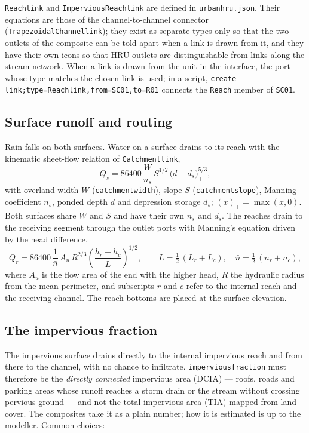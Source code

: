 \documentclass[11pt,a4paper]{article}
\newcommand{\code}[1]{\texttt{\small #1}}
\newcommand{\file}[1]{\texttt{\small #1}}
\renewcommand{\_}{\oldus\allowbreak}   %
\begin{document}
\code{Reach\_link} and \code{Impervious\_Reach\_link} are defined in \file{urban\_hru.json}. Their
equations are those of the channel-to-channel connector (\code{Trapezoidal\_Channel\_link}); they exist
as separate types only so that the two outlets of the composite can be told apart when a link is drawn
from it, and they have their own icons so that HRU outlets are distinguishable from links along the
stream network. When a link is drawn from the unit in the interface, the port whose type matches the
chosen link is used; in a script, \code{create link;type=Reach\_link,from=SC01,to=R01} connects the
\code{Reach} member of \code{SC01}.

\subsection{Surface runoff and routing}
Rain falls on both surfaces. Water on a surface drains to its reach with the kinematic sheet-flow
relation of \code{Catchment\_link},
\begin{equation}
  Q_s = 86400\,\frac{W}{n_s}\,S^{1/2}\,\big(d-d_s\big)_+^{5/3},
\end{equation}
with overland width $W$ (\code{catchment\_width}), slope $S$ (\code{catchment\_slope}), Manning
coefficient $n_s$, ponded depth $d$ and depression storage $d_s$; $(x)_+=\max(x,0)$. Both surfaces
share $W$ and $S$ and have their own $n_s$ and $d_s$. The reaches drain to the receiving segment
through the outlet ports with Manning's equation driven by the head difference,
\begin{equation}
  Q_r = 86400\,\frac{1}{\bar n}\,A_u\,R^{2/3}\left(\frac{h_r-h_c}{\bar L}\right)^{1/2},
  \qquad \bar L=\tfrac12\,(L_r+L_c),\quad \bar n=\tfrac12\,(n_r+n_c),
  \label{eq:outlet}
\end{equation}
where $A_u$ is the flow area of the end with the higher head, $R$ the hydraulic radius from the
mean perimeter, and subscripts $r$ and $c$ refer to the internal reach and the receiving channel.
The reach bottoms are placed at the surface elevation.

\subsection{The impervious fraction}
\label{sec:impfrac}
The impervious surface drains directly to the internal impervious reach and from there to the
channel, with no chance to infiltrate. \code{impervious\_fraction} must therefore be the
\emph{directly connected} impervious area (DCIA) --- roofs, roads and parking areas whose runoff
reaches a storm drain or the stream without crossing pervious ground --- and not the total impervious
area (TIA) mapped from land cover. The composites take it as a plain number; how it is estimated is
up to the modeller. Common choices:
\end{document}
